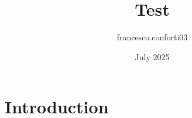 \documentclass{article}
\title{Test}
\author{francesco.conforti03 }
\date{July 2025}
\begin{document}
\maketitle

\section{Introduction}
\end{document}
